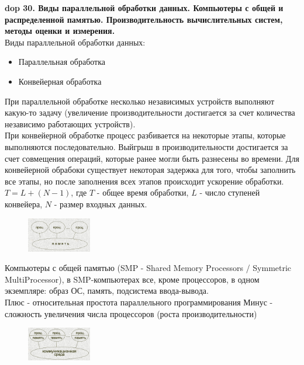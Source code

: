\setcounter{section}{4}
\setcounter{subsection}{30}
\setcounter{equation}{0}
\textbf{\LARGE dop 30. Виды параллельной обработки данных. Компьютеры с общей и распределенной памятью. Производительность вычислительных систем, методы оценки и измерения.}\\

Виды параллельной обработки данных:
\begin{itemize}
    \item Параллельная обработка
    \item Конвейерная обработка
\end{itemize}

При параллельной обработке несколько независимых устройств выполняют какую-то задачу (увеличение производительности достигается за счет количества независимо работающих устройств).\\
При конвейерной обработке процесс разбивается на некоторые этапы, которые выполняются последовательно. Выйгрыш в производительности достигается за счет совмещения операций, которые ранее могли быть разнесены во времени. Для конвейерной обрабоки существует некоторая задержка для того, чтобы заполнить все этапы, но после заполнения всех этапов происходит ускорение обработки. $T = L + (N - 1)$, где $T$ - общее время обработки, $L$ - число ступеней конвейера, $N$ - размер входных данных.\\

\begin{figure}
    \centering
    \includegraphics[width=0.25\textwidth]{pics/smp-computer.png}
\end{figure}

Компьютеры с общей памятью (SMP - Shared Memory Processors / Symmetric MultiProcessor), в SMP-компьютерах все, кроме процессоров, в одном экземпляре: образ ОС, память, подсистема ввода-вывода.\\
Плюс - относительная простота параллельного программирования
Минус - сложность увеличения числа процессоров (роста производительности)\\


\begin{figure}
    \centering
    \includegraphics[width=0.25\textwidth]{pics/distributed-memory-computer.png}
\end{figure}

